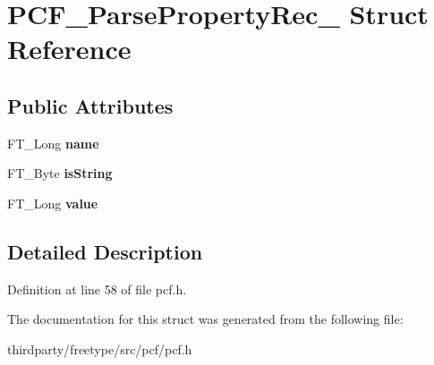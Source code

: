 \hypertarget{struct_p_c_f___parse_property_rec__}{}\section{P\+C\+F\+\_\+\+Parse\+Property\+Rec\+\_\+ Struct Reference}
\label{struct_p_c_f___parse_property_rec__}
\subsection*{Public Attributes}
\begin{DoxyCompactItemize}
\item 
\mbox{\label{struct_p_c_f___parse_property_rec___a3d66f8d18db9b44249a782faffa7b348}} 
F\+T\+\_\+\+Long {\bfseries name}
\item 
\mbox{\label{struct_p_c_f___parse_property_rec___a2b7224d19b12bce7094f4ef8a0f750d1}} 
F\+T\+\_\+\+Byte {\bfseries is\+String}
\item 
\mbox{\label{struct_p_c_f___parse_property_rec___aaae3096dcf2b5b5d249bf878b6cdd57f}} 
F\+T\+\_\+\+Long {\bfseries value}
\end{DoxyCompactItemize}


\subsection{Detailed Description}


Definition at line 58 of file pcf.\+h.



The documentation for this struct was generated from the following file\+:\begin{DoxyCompactItemize}
\item 
thirdparty/freetype/src/pcf/pcf.\+h\end{DoxyCompactItemize}
